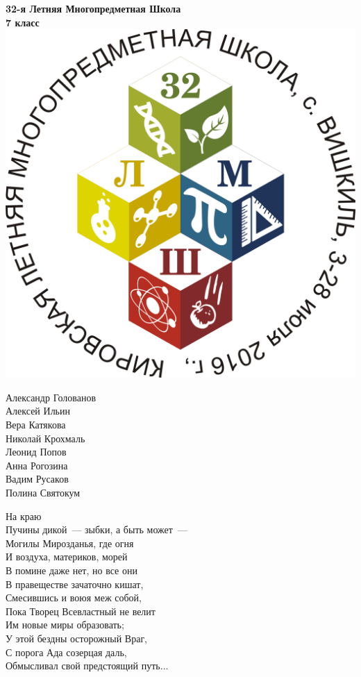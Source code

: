 \documentclass[10pt]{book}
\begin{document}
\begin{center}
	\Huge{\bf 32-я Летняя Многопредметная Школа}\\
	\Large{\bf 7 класс}\\ \vspace{.3cm}
	\includegraphics[width=\textwidth]{logo}
	\begin{multicols}{2}
		Александр Голованов \\
		Алексей Ильин \\
		Вера Катякова \\
		Николай Крохмаль \\
		Леонид Попов \\
		Анна Рогозина \\
		Вадим Русаков \\
		Полина Святокум \\
	\end{multicols}
\end{center}

\newpage

\begin{center}
На краю \\
Пучины дикой~--- зыбки, а быть может~--- \\
Могилы Мирозданья, где огня\\
И воздуха, материков, морей\\
В помине даже нет, но все они\\
В правеществе зачаточно кишат,\\
Смесившись и воюя меж собой,\\
Пока Творец Всевластный не велит\\
Им новые миры образовать;\\
У этой бездны осторожный Враг,\\
С порога Ада созерцая даль,\\
Обмысливал свой предстоящий путь...
\end{center}
\end{document}
